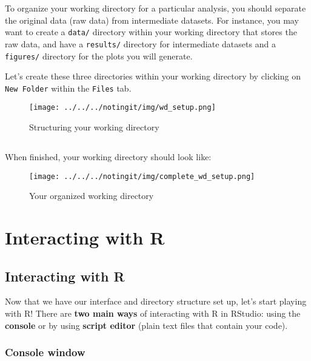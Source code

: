 \documentclass[
]{article}
\begin{document}
To organize your working directory for a particular analysis, you should
separate the original data (raw data) from intermediate datasets. For
instance, you may want to create a \texttt{data/} directory within your
working directory that stores the raw data, and have a \texttt{results/}
directory for intermediate datasets and a \texttt{figures/} directory
for the plots you will generate.

Let's create these three directories within your working directory by
clicking on \texttt{New\ Folder} within the \texttt{Files} tab.

\begin{figure}
\centering
\texttt{[image: ../../../notingit/img/wd\_setup.png]}
\caption{Structuring your working directory}
\end{figure}

\hypertarget{section-6}{%
\subsection{}\label{section-6}}

When finished, your working directory should look like:

\begin{figure}
\centering
\texttt{[image: ../../../notingit/img/complete\_wd\_setup.png]}
\caption{Your organized working directory}
\end{figure}

\hypertarget{interacting-with-r}{%
\section{Interacting with R}\label{interacting-with-r}}

\hypertarget{interacting-with-r-1}{%
\subsection{Interacting with R}\label{interacting-with-r-1}}

Now that we have our interface and directory structure set up, let's
start playing with R! There are \textbf{two main ways} of interacting
with R in RStudio: using the \textbf{console} or by using \textbf{script
editor} (plain text files that contain your code).

\hypertarget{console-window}{%
\subsubsection{Console window}\label{console-window}}
\end{document}
